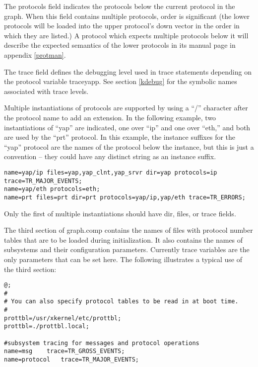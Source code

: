 The {\sanss protocols} field indicates the protocols below the current
protocol in the graph.  When this field contains multiple protocols, order is
significant (the lower protocols will be loaded into the upper
protocol's down vector in the order in which they are listed.)
A protocol which expects multiple protocols below it will describe the
expected semantics of the lower protocols in its manual page in
appendix \ref{protman}.

The {\sanss trace} field defines the debugging level used in trace
statements depending on the protocol variable {\sanss traceyapp}.  See
section \ref{kdebug} for the symbolic names associated with trace levels.

Multiple instantiations of protocols are supported by using a ``/''
character after the protocol name to add an extension.  In the
following example, two instantiations of ``yap'' are indicated, one
over ``ip'' and one over ``eth,'' and both are used by the ``prt''
protocol.  In this example, the instance suffixes for the ``yap''
protocol are the names of the protocol below the instance, but this is
just a convention -- they could have any distinct string as an
instance suffix.
\let\tt=\COURIERtt
\begin{verbatim}
name=yap/ip files=yap,yap_clnt,yap_srvr dir=yap protocols=ip trace=TR_MAJOR_EVENTS;
name=yap/eth protocols=eth;
name=prt files=prt dir=prt protocols=yap/ip,yap/eth trace=TR_ERRORS;
\end{verbatim}
\let\tt=\CMRtt

\noindent Only the first of multiple instantiations should have {\sanss dir},
{\sanss files}, or {\sanss trace} fields.

The third section of graph.comp contains the names of files with
protocol number tables that are to be loaded during initialization.
It also contains the names of subsystems and their configuration
parameters.  Currently trace variables are the only parameters that
can be set here.  The following illustrates a typical use of the third
section:

\let\tt=\COURIERtt
\begin{verbatim}
@;
#
# You can also specify protocol tables to be read in at boot time.
#
prottbl=/usr/xkernel/etc/prottbl;
prottbl=./prottbl.local;

#subsystem tracing for messages and protocol operations
name=msg	trace=TR_GROSS_EVENTS;
name=protocol	trace=TR_MAJOR_EVENTS;
\end{verbatim}
\let\tt=\CMRtt

